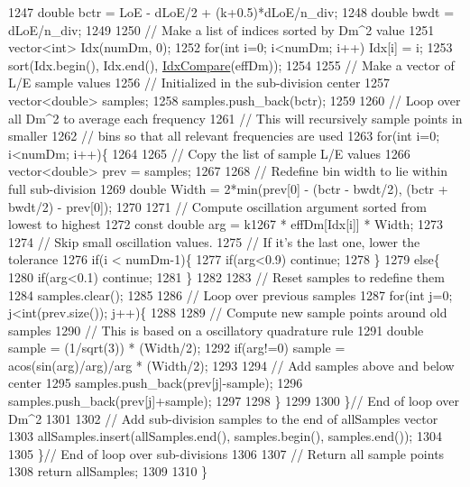 \begin{DoxyCode}
1247     \textcolor{keywordtype}{double} bctr = LoE - dLoE/2 + (k+0.5)*dLoE/n\_div;
1248     \textcolor{keywordtype}{double} bwdt = dLoE/n\_div;
1249 
1250     \textcolor{comment}{// Make a list of indices sorted by Dm^2 value}
1251     vector<int> Idx(numDm, 0);
1252     \textcolor{keywordflow}{for}(\textcolor{keywordtype}{int} i=0; i<numDm; i++) Idx[i] = i;
1253     sort(Idx.begin(), Idx.end(), \hyperlink{structOscProb_1_1IdxCompare}{IdxCompare}(effDm));
1254 
1255     \textcolor{comment}{// Make a vector of L/E sample values}
1256     \textcolor{comment}{// Initialized in the sub-division center}
1257     vector<double> samples;
1258     samples.push\_back(bctr);
1259 
1260     \textcolor{comment}{// Loop over all Dm^2 to average each frequency}
1261     \textcolor{comment}{// This will recursively sample points in smaller}
1262     \textcolor{comment}{// bins so that all relevant frequencies are used}
1263     \textcolor{keywordflow}{for}(\textcolor{keywordtype}{int} i=0; i<numDm; i++)\{
1264 
1265       \textcolor{comment}{// Copy the list of sample L/E values}
1266       vector<double> prev = samples;
1267 
1268       \textcolor{comment}{// Redefine bin width to lie within full sub-division}
1269       \textcolor{keywordtype}{double} Width = 2*min(prev[0] - (bctr - bwdt/2), (bctr + bwdt/2) - prev[0]);
1270 
1271       \textcolor{comment}{// Compute oscillation argument sorted from lowest  to highest}
1272       \textcolor{keyword}{const} \textcolor{keywordtype}{double} arg = k1267 * effDm[Idx[i]] * Width;
1273 
1274       \textcolor{comment}{// Skip small oscillation values.}
1275       \textcolor{comment}{// If it's the last one, lower the tolerance}
1276       \textcolor{keywordflow}{if}(i < numDm-1)\{
1277         \textcolor{keywordflow}{if}(arg<0.9) \textcolor{keywordflow}{continue};
1278       \}
1279       \textcolor{keywordflow}{else}\{
1280         \textcolor{keywordflow}{if}(arg<0.1) \textcolor{keywordflow}{continue};
1281       \}
1282 
1283       \textcolor{comment}{// Reset samples to redefine them}
1284       samples.clear();
1285 
1286       \textcolor{comment}{// Loop over previous samples}
1287       \textcolor{keywordflow}{for}(\textcolor{keywordtype}{int} j=0; j<int(prev.size()); j++)\{
1288 
1289         \textcolor{comment}{// Compute new sample points around old samples}
1290         \textcolor{comment}{// This is based on a oscillatory quadrature rule}
1291         \textcolor{keywordtype}{double} sample = (1/sqrt(3)) * (Width/2);
1292         \textcolor{keywordflow}{if}(arg!=0) sample = acos(sin(arg)/arg)/arg * (Width/2);
1293 
1294         \textcolor{comment}{// Add samples above and below center}
1295         samples.push\_back(prev[j]-sample);
1296         samples.push\_back(prev[j]+sample);
1297 
1298       \}
1299 
1300     \}\textcolor{comment}{// End of loop over Dm^2}
1301 
1302     \textcolor{comment}{// Add sub-division samples to the end of allSamples vector}
1303     allSamples.insert(allSamples.end(), samples.begin(), samples.end());
1304 
1305   \}\textcolor{comment}{// End of loop over sub-divisions}
1306 
1307   \textcolor{comment}{// Return all sample points}
1308   \textcolor{keywordflow}{return} allSamples;
1309 
1310 \}
\end{DoxyCode}
